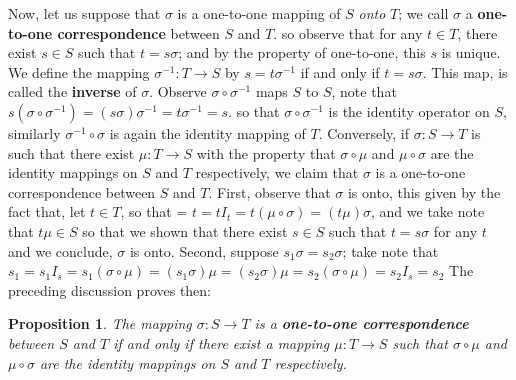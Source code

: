 \documentclass[11pt,a4paper]{article}
\newtheorem{claim}{Proposition}
\begin{document}
Now, let us suppose that $ \sigma $ is a one-to-one mapping of $S$ \emph{onto} $T$; we call $\sigma$ a \textbf{one-to-one correspondence}
between $S$ and $T$. so observe that for any $t \in T$, there exist $ s \in S$ such that $t = s\sigma $; and by the property of one-to-one, this $s$ is unique. We define the mapping $ \sigma^{-1}: T \rightarrow S $ by $ s = t \sigma^{-1} $ if and only if $ t = s\sigma $. This map, is called the \textbf{inverse} of $ \sigma$. Observe $ \sigma \circ \sigma^{-1} $ maps $S$ to $S$, note that $ s(\sigma \circ \sigma^{-1}) = (s \sigma)\sigma^{-1} = t \sigma^{-1} = s $. so that $ \sigma \circ \sigma^{-1} $ is the identity operator on $S$, similarly $ \sigma^{-1} \circ \sigma $ is again the identity mapping of $T$.
Conversely, if $\sigma: S \rightarrow T$  is such that there exist $ \mu: T \rightarrow S$ with the property that $ \sigma \circ \mu$ and $ \mu \circ \sigma$ are the identity mappings on $S$ and $T$ respectively, we claim that $\sigma$ is a one-to-one correspondence between $S$ and $T$. First, observe that $ \sigma$ is onto, this given by the fact that, let $t \in T$, so that = $t = t I_t = t(\mu \circ \sigma) = (t\mu)\sigma$, and we take note that $ t \mu \in S$ so that we shown that there exist $ s \in S$ such that $ t = s \sigma $ for any $t$ and we conclude, $ \sigma $ is onto. Second, suppose $ s_1 \sigma = s_2 \sigma $; take note that $ s_1 = s_1 I_s = s_1 (\sigma \circ \mu) = ( s_1 \sigma)\mu = (s_2 \sigma)\mu = s_2(\sigma \circ \mu) = s_2 I_s = s_2 $
The preceding discussion proves then:
\begin{claim} \label{pro:existenceofonetoonecorrespondence}
	The mapping $ \sigma: S \rightarrow T $ is a \textbf{one-to-one correspondence} between $S$ and $T$ if and only if there exist a mapping $\mu: T \rightarrow S$ such that $ \sigma \circ \mu $ and $ \mu \circ \sigma $ are the identity mappings on $S$ and $T$ respectively.
\end{claim}
\end{document}
